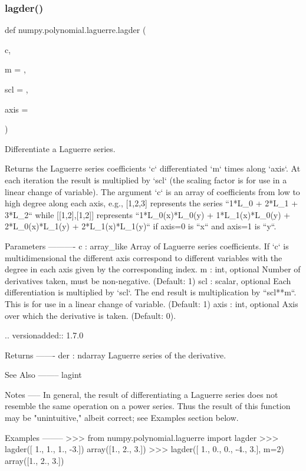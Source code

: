 \subsubsection{\texorpdfstring{lagder()}{lagder()}}
{\footnotesize\ttfamily def numpy.\+polynomial.\+laguerre.\+lagder (\begin{DoxyParamCaption}\item[{}]{c,  }\item[{}]{m = {},  }\item[{}]{scl = {},  }\item[{}]{axis = {} }\end{DoxyParamCaption})}

\begin{DoxyVerb}Differentiate a Laguerre series.

Returns the Laguerre series coefficients `c` differentiated `m` times
along `axis`.  At each iteration the result is multiplied by `scl` (the
scaling factor is for use in a linear change of variable). The argument
`c` is an array of coefficients from low to high degree along each
axis, e.g., [1,2,3] represents the series ``1*L_0 + 2*L_1 + 3*L_2``
while [[1,2],[1,2]] represents ``1*L_0(x)*L_0(y) + 1*L_1(x)*L_0(y) +
2*L_0(x)*L_1(y) + 2*L_1(x)*L_1(y)`` if axis=0 is ``x`` and axis=1 is
``y``.

Parameters
----------
c : array_like
    Array of Laguerre series coefficients. If `c` is multidimensional
    the different axis correspond to different variables with the
    degree in each axis given by the corresponding index.
m : int, optional
    Number of derivatives taken, must be non-negative. (Default: 1)
scl : scalar, optional
    Each differentiation is multiplied by `scl`.  The end result is
    multiplication by ``scl**m``.  This is for use in a linear change of
    variable. (Default: 1)
axis : int, optional
    Axis over which the derivative is taken. (Default: 0).

    .. versionadded:: 1.7.0

Returns
-------
der : ndarray
    Laguerre series of the derivative.

See Also
--------
lagint

Notes
-----
In general, the result of differentiating a Laguerre series does not
resemble the same operation on a power series. Thus the result of this
function may be "unintuitive," albeit correct; see Examples section
below.

Examples
--------
>>> from numpy.polynomial.laguerre import lagder
>>> lagder([ 1.,  1.,  1., -3.])
array([1.,  2.,  3.])
>>> lagder([ 1.,  0.,  0., -4.,  3.], m=2)
array([1.,  2.,  3.])\end{DoxyVerb}
 \mbox{\label{namespacenumpy_1_1polynomial_1_1laguerre_ab63c671d9776cb4e536aae3a32bc022b}} 
